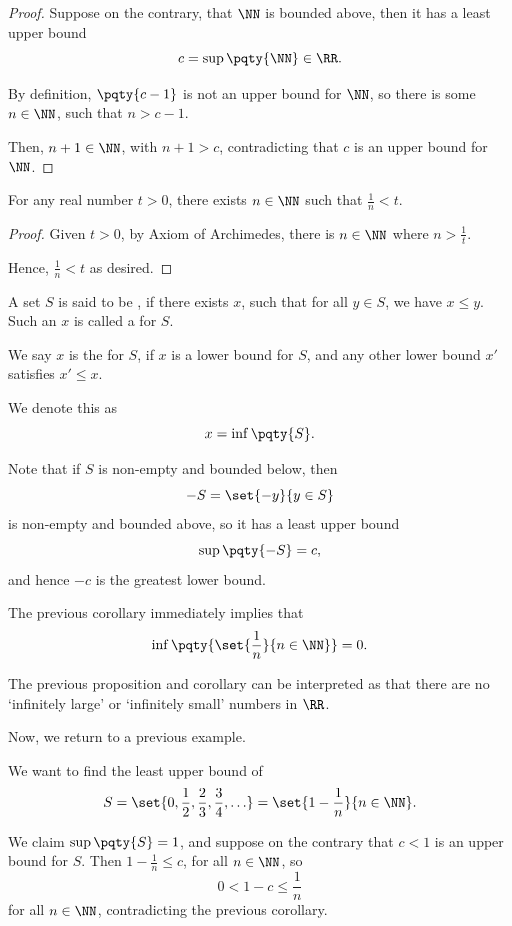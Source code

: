 \begin{proof}
    Suppose on the contrary, that \(\NN\) is bounded above, then it has a least upper bound
    \[
        c = \sup \pqty{\NN} \in \RR.
    \]

    By definition, \(\pqty{c - 1}\) is not an upper bound for \(\NN\), so there is some \(n \in \NN\), such that \(n > c - 1\).

    Then, \(n + 1 \in \NN\), with \(n + 1 > c\), contradicting that \(c\) is an upper bound for \(\NN\).
\end{proof}

\begin{corollary}
    For any real number \(t > 0\), there exists \(n \in \NN\) such that \(\frac{1}{n} < t\).
\end{corollary}

\begin{proof}
    Given \(t > 0\), by Axiom of Archimedes, there is \(n \in \NN\) where \(n > \frac{1}{t}\).

    Hence, \(\frac{1}{n} < t\) as desired.
\end{proof}

\begin{definition}
    A set \(S\) is said to be , if there exists \(x\), such that for all \(y \in S\), we have \(x \leq y\). Such an \(x\) is called a  for \(S\).

    We say \(x\) is the  for \(S\), if \(x\) is a lower bound for \(S\), and any other lower bound \(x'\) satisfies \(x' \leq x\).

    We denote this as
    \[
        x = \inf \pqty{S}.
    \]
\end{definition}

Note that if \(S\) is non-empty and bounded below, then
\[
    -S = \set{-y}{y \in S}
\]
is non-empty and bounded above, so it has a least upper bound
\[
    \sup \pqty{-S} = c,
\]
and hence \(-c\) is the greatest lower bound.

The previous corollary immediately implies that
\[
    \inf \pqty{\set{\frac{1}{n}}{n \in \NN}} = 0.
\]

The previous proposition and corollary can be interpreted as that there are no `infinitely large' or `infinitely small' numbers in \(\RR\).

Now, we return to a previous example.

\begin{example}
    We want to find the least upper bound of
    \[
        S = \set{0, \frac{1}{2}, \frac{2}{3}, \frac{3}{4}, \ldots} = \set{1 - \frac{1}{n}}{n \in \NN}.
    \]

    We claim \(\sup \pqty{S} = 1\), and suppose on the contrary that \(c < 1\) is an upper bound for \(S\). Then \(1 - \frac{1}{n} \leq c\), for all \(n \in \NN\), so
    \[
        0 < 1 - c \leq \frac{1}{n}
    \]
    for all \(n \in \NN\), contradicting the previous corollary.
\end{example}

